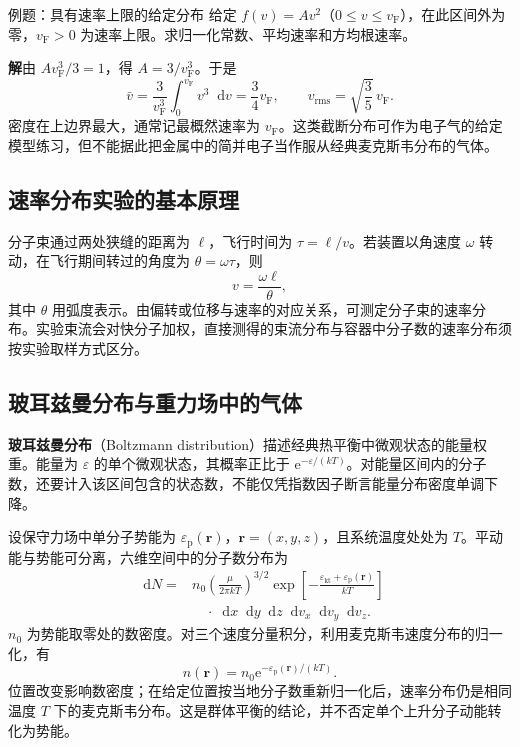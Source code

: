 \documentclass[UTF8,fontset=none,zihao=-4,a4paper]{ctexart}
\newcommand{\term}[1]{\textbf{#1}}
\newcommand{\dd}{\mathop{}\!\mathrm{d}}
\newcommand{\ee}{\mathrm{e}}
\newcommand{\sol}{\par\noindent\textbf{解}\quad}
\begin{document}
\begin{infobox}{例题：具有速率上限的给定分布}
给定 $f(v)=Av^2$（$0\le v\le v_{\mathrm F}$），在此区间外为零，$v_{\mathrm F}>0$ 为速率上限。求归一化常数、平均速率和方均根速率。
\end{infobox}
\sol 由 $Av_{\mathrm F}^3/3=1$，得 $A=3/v_{\mathrm F}^3$。于是
\[
 \bar v=\frac{3}{v_{\mathrm F}^3}\int_0^{v_{\mathrm F}}v^3\dd v
 =\frac34v_{\mathrm F},\qquad
 v_{\mathrm{rms}}=\sqrt{\frac35}\,v_{\mathrm F}.
\]
密度在上边界最大，通常记最概然速率为 $v_{\mathrm F}$。这类截断分布可作为电子气的给定模型练习，但不能据此把金属中的简并电子当作服从经典麦克斯韦分布的气体。

\subsection{速率分布实验的基本原理}
分子束通过两处狭缝的距离为 $\ell$，飞行时间为 $\tau=\ell/v$。若装置以角速度 $\omega$ 转动，在飞行期间转过的角度为 $\theta=\omega\tau$，则
\[
 v=\frac{\omega\ell}{\theta},
\]
其中 $\theta$ 用弧度表示。由偏转或位移与速率的对应关系，可测定分子束的速率分布。实验束流会对快分子加权，直接测得的束流分布与容器中分子数的速率分布须按实验取样方式区分。

\subsection{玻耳兹曼分布与重力场中的气体}
\term{玻耳兹曼分布}（Boltzmann distribution）描述经典热平衡中微观状态的能量权重。能量为 $\varepsilon$ 的单个微观状态，其概率正比于 $\ee^{-\varepsilon/(kT)}$。对能量区间内的分子数，还要计入该区间包含的状态数，不能仅凭指数因子断言能量分布密度单调下降。

设保守力场中单分子势能为 $\varepsilon_{\mathrm p}(\symbf r)$，$\symbf r=(x,y,z)$，且系统温度处处为 $T$。平动能与势能可分离，六维空间中的分子数分布为
\begin{align*}
 \dd N={}&n_0\left(\frac{\mu}{2\pi kT}\right)^{3/2}
 \exp\left[-\frac{\varepsilon_{\mathrm{kt}}+
 \varepsilon_{\mathrm p}(\symbf r)}{kT}\right]\\
 &\hspace{1em}\cdot\dd x\dd y\dd z\dd v_x\dd v_y\dd v_z.
\end{align*}
$n_0$ 为势能取零处的数密度。对三个速度分量积分，利用麦克斯韦速度分布的归一化，有
\[
 n(\symbf r)=n_0\ee^{-\varepsilon_{\mathrm p}(\symbf r)/(kT)}.
\]
位置改变影响数密度；在给定位置按当地分子数重新归一化后，速率分布仍是相同温度 $T$ 下的麦克斯韦分布。这是群体平衡的结论，并不否定单个上升分子动能转化为势能。
\end{document}
